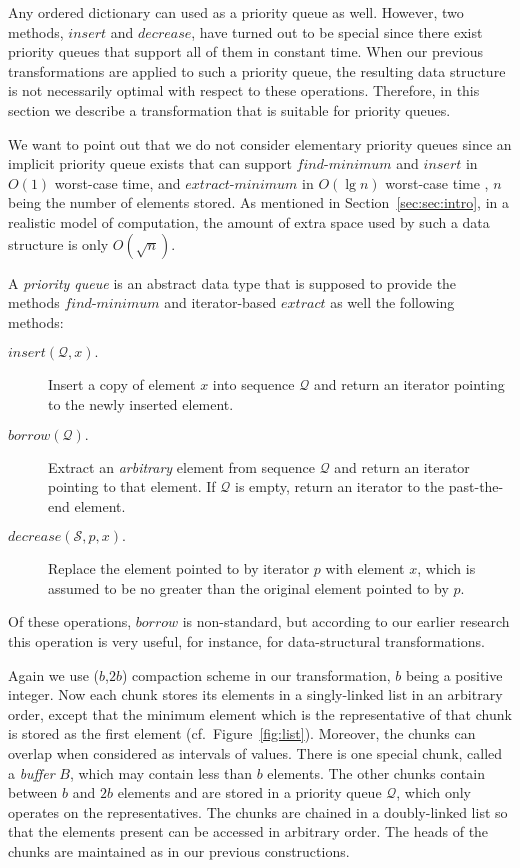 \documentclass{DIKU-article}
\newcommand{\Findmin}{\mbox{$\mathit{find}$\textnormal{-}}\allowbreak{}\mbox{$\mathit{minimum}$}}
\newcommand{\Findmax}{\mbox{$\mathit{find}$\textnormal{-}}\allowbreak{}\mbox{$\mathit{maximum}$}}
\newcommand{\Insert}{\mbox{$\mathit{insert}$}}
\newcommand{\Extract}{\mbox{$\mathit{extract}$}}
\newcommand{\Extractmin}{\mbox{$\mathit{extract}$\textnormal{-}$\mathit{minimum}$}}
\newcommand{\Extractmax}{\mbox{$\mathit{extract}$\textnormal{-}$\mathit{maximum}$}}
\newcommand{\Decrease}{\mbox{$\mathit{decrease}$}}
\newcommand{\Borrow}{\mbox{$\mathit{borrow}$}}
\newcommand{\secref}[1]{\mbox{Section~\ref{sec:#1}}}
\begin{document}
Any ordered dictionary can used as a priority queue as well. However,
two methods, \Insert{} and \Decrease{}, have turned out to be special
since there exist priority queues that support all of them in constant
time.  When our previous transformations are applied to such a
priority queue, the resulting data structure is not necessarily
optimal with respect to these operations. Therefore, in this section
we describe a transformation that is suitable for priority queues.

We want to point out that we do not consider elementary priority
queues since an implicit priority queue exists that can support
\Findmin{} and \Insert{} in $O(1)$ worst-case time, and \Extractmin{} in
$O(\lg n)$ worst-case time \cite{CMP88}, $n$ being the number of
elements stored. As mentioned in \secref{sec:intro}, in a realistic
model of computation, the amount of extra space used by such a data
structure is only $O(\sqrt{n})$.%

A \emph{priority queue} is an abstract data type that is supposed to
provide the methods \Findmin{} and iterator-based \Extract{} as well
the following methods:
\begin{description}
\item[\Insert{}$(\mathcal{Q}, x).$] Insert a copy of element $x$ into sequence $\mathcal{Q}$ and return an iterator pointing to the newly inserted
element.

\item[\Borrow{}$(\mathcal{Q}).$] Extract an \emph{arbitrary} element from
sequence $\mathcal{Q}$ and return an iterator pointing to that element. If $\mathcal{Q}$
is empty, return an iterator to the past-the-end element.

\item[\Decrease{}$(\mathcal{S}, p, x).$] Replace the element pointed to by
iterator $p$ with element $x$, which is assumed to be no greater than
the original element pointed to by $p$.
\end{description}
Of these operations, \Borrow{} is non-standard, but according to our
earlier research \cite{EJK04,EJK07} this operation is very useful, for
instance, for data-structural transformations.

Again we use ($b$,$2b$) compaction scheme in our transformation, $b$
being a positive integer. Now each chunk stores its elements in a
singly-linked list in an arbitrary order, except that the minimum
element which is the representative of that chunk is stored as the
first element (cf.~Figure~\ref{fig:list}).  Moreover, the chunks can
overlap when considered as intervals of values.  There is one special
chunk, called a \emph{buffer} $B$, which may contain less than $b$
elements. The other chunks contain between $b$ and $2b$ elements and
are stored in a priority queue $\mathcal{Q}$, which only operates on
the representatives. The chunks are chained in a doubly-linked list so
that the elements present can be accessed in arbitrary order. 
The heads of the chunks are maintained as in our previous constructions.
\end{document}
